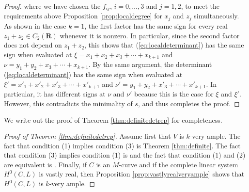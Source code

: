 \documentclass[12pt]{amsart}
\numberwithin{equation}{section}
\numberwithin{thmcounter}{section}
\theoremstyle{definition}
\theoremstyle{claim}
\newcommand{\nR}{\mathbf{R}}
\begin{document}
\begin{proof}
    where we have chosen the $f_{ij}$, $i=0,\ldots,3$ and $j=1,2$, to meet the requirements above Proposition \ref{prop:localdegree} for $x_j$ and $z_j$ simultaneously. As shown in the case $k=1$, the first factor has the same sign for every real $z_1+z_2\in C_2(\nR)$ whenever it is nonzero. In particular, since the second factor does not depend on $z_1+z_2$, this shows that (\ref{eq:localdeterminant}) has the same sign when evaluated at $\xi=x_1+x_2+x_3+\cdots+x_{k+1}$ and $\nu=y_1+y_2+x_3+\cdots+x_{k+1}$. By the same argument, the determinant (\ref{eq:localdeterminant}) has the same sign when evaluated at $\xi'=x'_1+x'_2+x'_3+\cdots+x'_{k+1}$ and $\nu'=y_1+y_2+x'_3+\cdots+x'_{k+1}$. In particular, it has different signs at $\nu$ and $\nu'$ because this is the case for $\xi$ and $\xi'$. However, this contradicts the minimality of $s$, and thus completes the proof.
\end{proof}

We write out the proof of Theorem \ref{thm:definitedetrep} for completeness.

\begin{proof}[Proof of Theorem \ref{thm:definitedetrep}]
  Assume first that $V$ is $k$-very ample. The fact that condition (1) implies condition (3) is Theorem \ref{thm:definite}. The fact that condition (3) implies condition (1) is \cite[Proposition 3.12]{shamovichvinnikov} and the fact that condition (1) and (2) are equivalent is \cite[Theorem 4.6]{kummersinn}. Finally, if $C$ is an $M$-curve and if the complete linear system $H^0(C,L)$ is vastly real, then Proposition \ref{prop:vastlyrealveryample} shows that $H^0(C,L)$ is $k$-very ample.
\end{proof}
\end{document}
